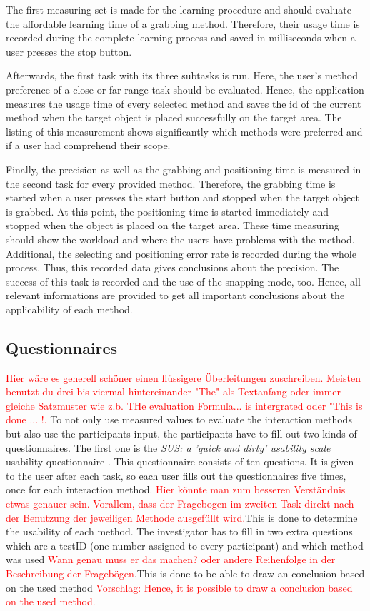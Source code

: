 The first measuring set is made for the learning procedure and should evaluate the affordable learning time of a grabbing method. Therefore, their usage time is recorded during the complete learning process and saved in milliseconds when a user presses the stop button. 

Afterwards, the first task with its three subtasks is run. Here, the user's method preference of a close or far range task should be evaluated. Hence, the application measures the usage time of every selected method and saves the id of the current method when the target object is placed successfully on the target area. The listing of this measurement shows significantly which methods were preferred and if a user had comprehend their scope.  

Finally, the precision as well as the grabbing and positioning time is measured in the second task for every provided method. Therefore, the grabbing time is started when a user presses the start button and stopped when the target object is grabbed. At this point, the positioning time is started immediately and stopped when the object is placed on the target area. These time measuring should show the workload and where the users have problems with the method. Additional, the selecting and positioning error rate is recorded during the whole process. Thus, this recorded data gives conclusions about the precision. The success of this task is recorded and the use of the snapping mode, too. Hence, all relevant informations are provided to get all important conclusions about the applicability of each method. 

\subsection{Questionnaires} \label{sec:questionnaires}

\textcolor{red}{Hier wäre es generell schöner einen flüssigere Überleitungen zuschreiben. Meisten benutzt du drei bis viermal hintereinander "The" als Textanfang oder immer gleiche Satzmuster wie z.b. THe evaluation Formula... is intergrated oder "This is done ... !. }
To not only use measured values to evaluate the interaction methods but also use the participants input, the participants have to fill out two kinds of questionnaires. The first one is the \textit{SUS: a 'quick and dirty' usability scale} usability questionnaire \citep{6sus}. This questionnaire consists of ten questions. It is given to the user after each task, so each user fills out the questionnaires five times, once for each interaction method. \textcolor{red}{Hier könnte man zum besseren Verständnis etwas genauer sein. Vorallem, dass der Fragebogen im zweiten Task direkt nach der Benutzung der jeweiligen Methode ausgefüllt wird.}This is done to determine the usability of each method. The investigator has to fill in two extra questions which are a testID (one number assigned to every participant) and which method was used \textcolor{red}{Wann genau muss er das machen? oder andere Reihenfolge in der Beschreibung der Fragebögen}.This is done to be able to draw an conclusion based on the used method \textcolor{red}{Vorschlag: Hence, it is possible to draw a conclusion based on the used method.}  \\ 

